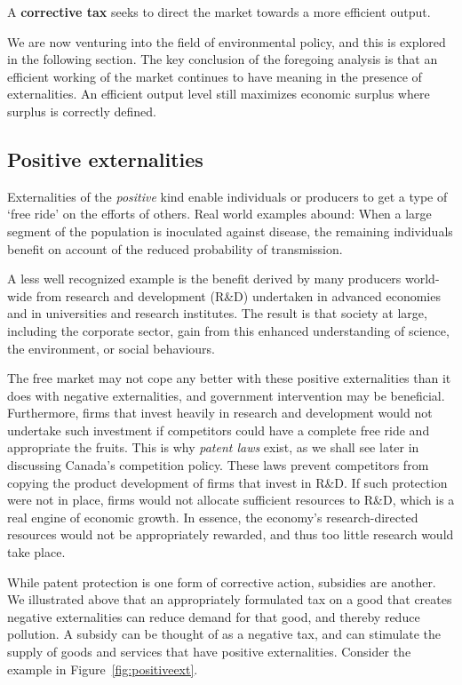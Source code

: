 \begin{DefBox}
A \textbf{corrective tax} seeks to direct the market towards a more efficient output.
\end{DefBox}

We are now venturing into the field of environmental policy, and this is
explored in the following section. The key conclusion of the foregoing
analysis is that an efficient working of the market continues to have
meaning in the presence of externalities. An efficient output level still
maximizes economic surplus where surplus is correctly defined.

\newhtmlpage

\subsection*{Positive externalities}

Externalities of the \textit{positive} kind enable individuals or producers
to get a type of `free ride' on the efforts of others. Real world examples
abound: When a large segment of the population is inoculated against
disease, the remaining individuals benefit on account of the reduced
probability of transmission.

A less well recognized example is the benefit derived by many producers
world-wide from research and development (R\&D) undertaken in advanced
economies and in universities and research institutes. The result is that
society at large, including the corporate sector, gain from this enhanced
understanding of science, the environment, or social behaviours.

The free market may not cope any better with these positive externalities
than it does with negative externalities, and government intervention may be
beneficial. Furthermore, firms that invest heavily in research and
development would not undertake such investment if competitors could have a
complete free ride and appropriate the fruits. This is why \textit{patent
laws} exist, as we shall see later in discussing Canada's competition
policy. These laws prevent competitors from copying the product development
of firms that invest in R\&D. If such protection were not in place, firms
would not allocate sufficient resources to R\&D, which is a real engine of
economic growth. In essence, the economy's research-directed resources would
not be appropriately rewarded, and thus too little research would take place.

\newhtmlpage

While patent protection is one form of corrective action, subsidies are
another. We illustrated above that an appropriately formulated tax on a good
that creates negative externalities can reduce demand for that good, and
thereby reduce pollution. A subsidy can be thought of as a negative tax, and
can stimulate the supply of goods and services that have positive
externalities. Consider the example in Figure~\ref{fig:positiveext}.

